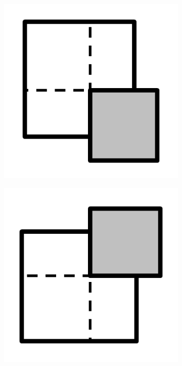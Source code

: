 \documentclass{article}
\begin{document}
\begin{figure}[!h]
\begin{subfigure}{.25\textwidth}
    \caption{}
    \label{fig:c2}
  \end{subfigure}%
  \begin{subfigure}{.25\textwidth}
    \centering
    \includegraphics[width=.95\linewidth]{16cases/c3.png}
    \caption{}
    \label{fig:c3}
  \end{subfigure}%
  \begin{subfigure}{.25\textwidth}
    \centering
    \includegraphics[width=.95\linewidth]{16cases/c4.png}

\end{subfigure}
\end{figure}
\end{document}
